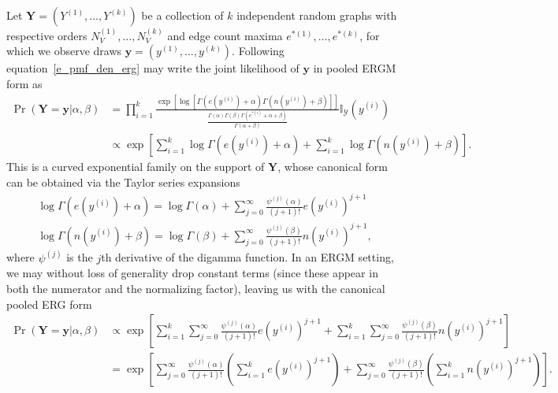 \documentclass[11pt]{article}
\begin{document}
Let $\mathbf{Y}=(Y^{(1)},\ldots,Y^{(k)})$ be a collection of $k$ independent random graphs with respective orders $N_V^{(1)},\ldots,N_V^{(k)}$ and edge count maxima $e^{*(1)},\ldots,e^{*(k)}$, for which we observe draws $\mathbf{y}=(y^{(1)},\ldots,y^{(k)})$.  Following equation~\ref{e_pmf_den_erg} may write the joint likelihood of $\mathbf{y}$ in pooled ERGM form as
\begin{align}
\Pr(\mathbf{Y}=\mathbf{y}|\alpha,\beta) &= \prod_{i=1}^k \frac{\exp\left[\log\left[\Gamma\left(e\left(y^{(i)}\right)+\alpha\right) \Gamma\left(n\left(y^{(i)}\right)+\beta\right)\right]\right]}{\frac{\Gamma(\alpha) \Gamma(\beta)\Gamma(e^{*(i)}+\alpha+\beta)}{\Gamma(\alpha+\beta)}} \mathbb{I}_\mathcal{Y}(y^{(i)}) \label{e_ergm_den_pooled}\\
&\propto \exp\left[\sum_{i=1}^k \log\Gamma\left(e\left(y^{(i)}\right)+\alpha\right) + \sum_{i=1}^k \log\Gamma\left(n\left(y^{(i)}\right)+\beta\right)\right]. \label{e_ergm_den_pooled}
\end{align}
This is a curved exponential family on the support of $\mathbf{Y}$, whose canonical form can be obtained via the Taylor series expansions
\begin{gather*}
\log\Gamma\left(e\left(y^{(i)}\right)+\alpha\right) = \log\Gamma(\alpha) + \sum_{j=0}^\infty \frac{\psi^{(j)}(\alpha)}{(j+1)!} e\left(y^{(i)}\right)^{j+1}\\
\log\Gamma\left(n\left(y^{(i)}\right)+\beta\right) = \log\Gamma(\beta) + \sum_{j=0}^\infty \frac{\psi^{(j)}(\beta)}{(j+1)!} n\left(y^{(i)}\right)^{j+1},
\end{gather*}
where $\psi^{(j)}$ is the $j$th derivative of the digamma function.  In an ERGM setting, we may without loss of generality drop constant terms (since these appear in both the numerator and the normalizing factor), leaving us with the canonical pooled ERG form
\begin{align}
\Pr(\mathbf{Y}=\mathbf{y}|\alpha,\beta) &\propto \exp\left[ \sum_{i=1}^k \sum_{j=0}^\infty \frac{\psi^{(j)}(\alpha)}{(j+1)!} e\left(y^{(i)}\right)^{j+1} + \sum_{i=1}^k \sum_{j=0}^\infty \frac{\psi^{(j)}(\beta)}{(j+1)!} n\left(y^{(i)}\right)^{j+1}\right] \nonumber\\
&= \exp\left[ \sum_{j=0}^\infty \frac{\psi^{(j)}(\alpha)}{(j+1)!} \left(\sum_{i=1}^k e\left(y^{(i)}\right)^{j+1}\right) + \sum_{j=0}^\infty \frac{\psi^{(j)}(\beta)}{(j+1)!} \left(\sum_{i=1}^k n\left(y^{(i)}\right)^{j+1}\right)\right]. \label{e_ergm_den_pooled_canonical}
\end{align}
\end{document}
